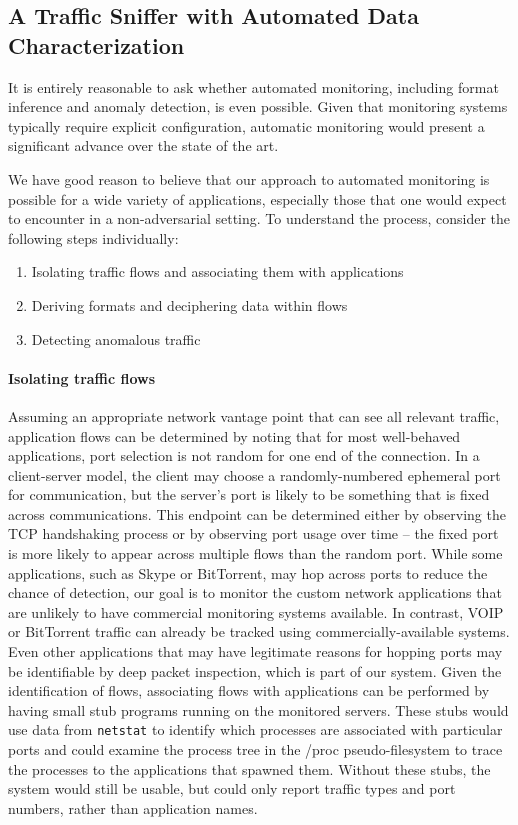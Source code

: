 \subsection{A Traffic Sniffer with Automated Data Characterization}

It is entirely reasonable to ask whether automated monitoring,
including format inference and anomaly detection, is even
possible. Given that monitoring systems typically require explicit
configuration, automatic monitoring would present a significant
advance over the state of the art.

We have good reason to believe that our approach to automated
monitoring is possible for a wide variety of applications, especially
those that one would expect to encounter in a non-adversarial setting.
To understand the process, consider the following steps individually:

\begin{enumerate}
\item Isolating traffic flows and associating them with applications
\item Deriving formats and deciphering data within flows
\item Detecting anomalous traffic
\end{enumerate}

\paragraph*{Isolating traffic flows} Assuming an appropriate network
vantage point that can see all relevant traffic, application flows can
be determined by noting that for most well-behaved applications, port
selection is not random for one end of the connection. In a
client-server model, the client may choose a randomly-numbered
ephemeral port for communication, but the server's port is likely to
be something that is fixed across communications. This endpoint can be
determined either by observing the TCP handshaking process or by
observing port usage over time -- the fixed port is more likely to
appear across multiple flows than the random port. While some
applications, such as Skype or BitTorrent, may hop across ports to
reduce the chance of detection, our goal is to monitor the custom
network applications that are unlikely to have commercial monitoring
systems available. In contrast, VOIP or BitTorrent traffic can already
be tracked using commercially-available systems. Even other
applications that may have legitimate reasons for hopping ports may be
identifiable by deep packet inspection, which is part of our
system. Given the identification of flows, associating flows with
applications can be performed by having small stub programs running on
the monitored servers. These stubs would use data from \texttt{netstat}
to identify which processes are associated with particular ports and
could examine the process tree in the /proc pseudo-filesystem to trace
the processes to the applications that spawned them. Without these
stubs, the system would still be usable, but could only report traffic
types and port numbers, rather than application names.

